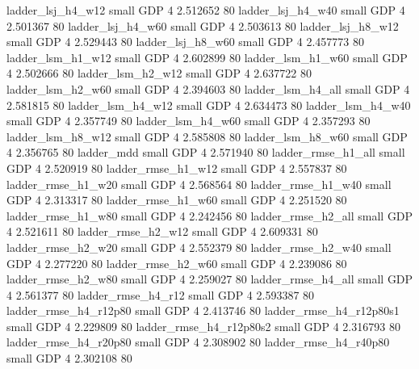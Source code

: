       ladder_lsj_h4_w12      small      GDP                 4 2.512652 80
       ladder_lsj_h4_w40      small      GDP                 4 2.501367 80
       ladder_lsj_h4_w60      small      GDP                 4 2.503613 80
       ladder_lsj_h8_w12      small      GDP                 4 2.529443 80
       ladder_lsj_h8_w60      small      GDP                 4 2.457773 80
       ladder_lsm_h1_w12      small      GDP                 4 2.602899 80
       ladder_lsm_h1_w60      small      GDP                 4 2.502666 80
       ladder_lsm_h2_w12      small      GDP                 4 2.637722 80
       ladder_lsm_h2_w60      small      GDP                 4 2.394603 80
       ladder_lsm_h4_all      small      GDP                 4 2.581815 80
       ladder_lsm_h4_w12      small      GDP                 4 2.634473 80
       ladder_lsm_h4_w40      small      GDP                 4 2.357749 80
       ladder_lsm_h4_w60      small      GDP                 4 2.357293 80
       ladder_lsm_h8_w12      small      GDP                 4 2.585808 80
       ladder_lsm_h8_w60      small      GDP                 4 2.356765 80
              ladder_mdd      small      GDP                 4 2.571940 80
      ladder_rmse_h1_all      small      GDP                 4 2.520919 80
      ladder_rmse_h1_w12      small      GDP                 4 2.557837 80
      ladder_rmse_h1_w20      small      GDP                 4 2.568564 80
      ladder_rmse_h1_w40      small      GDP                 4 2.313317 80
      ladder_rmse_h1_w60      small      GDP                 4 2.251520 80
      ladder_rmse_h1_w80      small      GDP                 4 2.242456 80
      ladder_rmse_h2_all      small      GDP                 4 2.521611 80
      ladder_rmse_h2_w12      small      GDP                 4 2.609331 80
      ladder_rmse_h2_w20      small      GDP                 4 2.552379 80
      ladder_rmse_h2_w40      small      GDP                 4 2.277220 80
      ladder_rmse_h2_w60      small      GDP                 4 2.239086 80
      ladder_rmse_h2_w80      small      GDP                 4 2.259027 80
      ladder_rmse_h4_all      small      GDP                 4 2.561377 80
      ladder_rmse_h4_r12      small      GDP                 4 2.593387 80
   ladder_rmse_h4_r12p80      small      GDP                 4 2.413746 80
 ladder_rmse_h4_r12p80s1      small      GDP                 4 2.229809 80
 ladder_rmse_h4_r12p80s2      small      GDP                 4 2.316793 80
   ladder_rmse_h4_r20p80      small      GDP                 4 2.308902 80
   ladder_rmse_h4_r40p80      small      GDP                 4 2.302108 80
